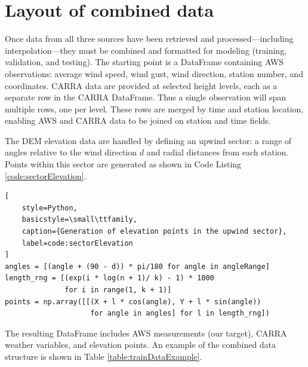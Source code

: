 \section{Layout of combined data}

Once data from all three sources have been retrieved and processed—including interpolation—they must be combined and formatted for modeling (training, validation, and testing). The starting point is a DataFrame containing AWS observations: average wind speed, wind gust, wind direction, station number, and coordinates. CARRA data are provided at selected height levels, each as a separate row in the CARRA DataFrame. Thus a single observation will span multiple rows, one per level. These rows are merged by time and station location, enabling AWS and CARRA data to be joined on station and time fields.

The DEM elevation data are handled by defining an upwind sector: a range of angles relative to the wind direction $d$ and radial distances from each station. Points within this sector are generated as shown in Code Listing \ref{code:sectorElevation}.

\begin{lstlisting}[
    style=Python,
    basicstyle=\small\ttfamily,
    caption={Generation of elevation points in the upwind sector},
    label=code:sectorElevation
]
angles = [(angle + (90 - d)) * pi/180 for angle in angleRange]
length_rng = [(exp(i * log(n + 1)/ k) - 1) * 1000 
              for i in range(1, k + 1)]
points = np.array([[(X + l * cos(angle), Y + l * sin(angle))
                    for angle in angles] for l in length_rng])   
\end{lstlisting}

The resulting DataFrame includes AWS measurements (our target), CARRA weather variables, and elevation points. An example of the combined data structure is shown in Table \ref{table:trainDataExample}.

\begin{table}[h]
    \centering
    \caption[Example of combined data structure]{Example of the combined data structure of features used for modeling. Data include derived variables Richardson number (Ri) and squared Brunt–Väisälä frequency ($N^2$), station altitude (meters above sea level), transformed wind direction (twd), wind speed (ws$_{15}$), wind direction (wd$_{15}$), temperature ($t_{15}$), pressure ($p_{15}$) (CARRA values at 15 m height), and elevation points (from DEM) in a sector pointing upwind.}
    \label{table:trainDataExample}
\end{table}

